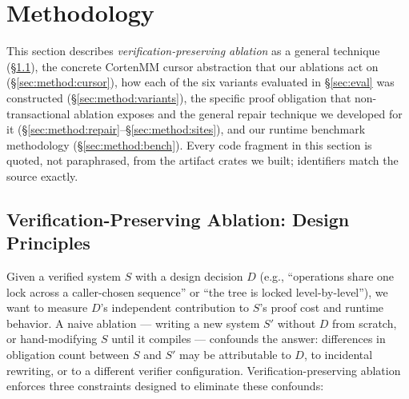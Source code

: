 \documentclass[10pt]{article}
\begin{document}
\section{Methodology}
\label{sec:method}

This section describes \emph{verification-preserving ablation} as a
general technique (\S\ref{sec:method:principle}), the concrete
CortenMM cursor abstraction that our ablations act on
(\S\ref{sec:method:cursor}), how each of the six variants evaluated in
\S\ref{sec:eval} was constructed (\S\ref{sec:method:variants}), the
specific proof obligation that non-transactional ablation exposes and
the general repair technique we developed for it
(\S\ref{sec:method:repair}--\S\ref{sec:method:sites}), and our runtime
benchmark methodology (\S\ref{sec:method:bench}). Every code fragment
in this section is quoted, not paraphrased, from the artifact crates we
built; identifiers match the source exactly.

\subsection{Verification-Preserving Ablation: Design Principles}
\label{sec:method:principle}

Given a verified system $S$ with a design decision $D$ (e.g., ``operations
share one lock across a caller-chosen sequence'' or ``the tree is locked
level-by-level''), we want to measure $D$'s independent contribution to
$S$'s proof cost and runtime behavior. A naive ablation --- writing a new
system $S'$ without $D$ from scratch, or hand-modifying $S$ until it
compiles --- confounds the answer: differences in obligation count
between $S$ and $S'$ may be attributable to $D$, to incidental
rewriting, or to a different verifier configuration. Verification-preserving
ablation enforces three constraints designed to eliminate these
confounds:
\end{document}
